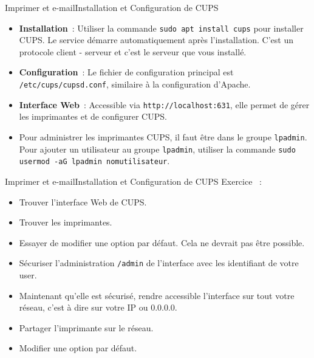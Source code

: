 \documentclass{beamer}
\begin{document}
    \begin{frame}{Imprimer et e-mail}{Installation et Configuration de CUPS}
        \begin{itemize}
            \item \textbf{Installation}~: Utiliser la commande \lstinline{sudo apt install cups} pour installer CUPS. Le service démarre automatiquement après l'installation.
            C'est un protocole client - serveur et c'est le serveur que vous installé.
            \item \textbf{Configuration}~: Le fichier de configuration principal est \lstinline{/etc/cups/cupsd.conf}, similaire à la configuration d'Apache.
            \item \textbf{Interface Web}~: Accessible via \lstinline{http://localhost:631}, elle permet de gérer les imprimantes et de configurer CUPS.
            \item Pour administrer les imprimantes CUPS, il faut être dans le groupe \lstinline{lpadmin}.
            Pour ajouter un utilisateur au groupe \lstinline{lpadmin}, utiliser la commande \lstinline{sudo usermod -aG lpadmin nomutilisateur}.
        \end{itemize}
    \end{frame}

    \begin{frame}{Imprimer et e-mail}{Installation et Configuration de CUPS}
        Exercice \execcounterdispinc~:
        \begin{itemize}
            \item Trouver l'interface Web de CUPS.
            \item Trouver les imprimantes.
            \item Essayer de modifier une option par défaut.
            Cela ne devrait pas être possible.
            \item Sécuriser l'administration \lstinline{/admin} de l'interface avec les identifiant de votre user.
            \item Maintenant qu'elle est sécurisé, rendre accessible l'interface sur tout votre réseau, c'est à dire sur votre IP ou 0.0.0.0.
            \item Partager l'imprimante sur le réseau.
            \item Modifier une option par défaut.
        \end{itemize}
    \end{frame}
\end{document}
